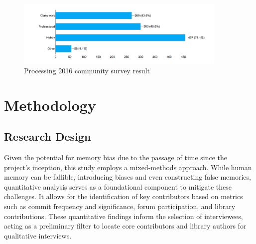 \documentclass[draft]{article}
\begin{document}
\begin{figure}[h!] 
  \centering
  \includegraphics[width=0.9\textwidth]{images/community-survey.png} 
  \caption{Processing 2016 community survey result \parencite{2016CommunitySurvey}}
  \label{fig:community_survey}
\end{figure}





\section{Methodology}

\subsection{Research Design}
Given the potential for memory bias due to the passage of time since the project's inception, this study employs a mixed-methods approach. While human memory can be fallible, introducing biases and even constructing false memories, quantitative analysis serves as a foundational component to mitigate these challenges. It allows for the identification of key contributors based on metrics such as commit frequency and significance, forum participation, and library contributions. These quantitative findings inform the selection of interviewees, acting as a preliminary filter to locate core contributors and library authors for qualitative interviews.
\end{document}
